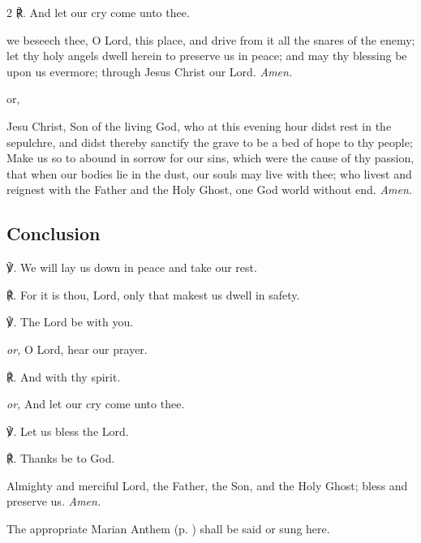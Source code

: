 \begin{multicols}{2}
℟. And let our cry come unto thee.

{} we beseech thee, O Lord, this place, and drive from it all the snares of the enemy; let thy holy angels dwell herein to preserve us in peace; and may thy blessing be upon us evermore; through Jesus Christ our Lord. \textit{Amen.}

\begin{inhead}
	or,
\end{inhead}

 Jesu Christ, Son of the living God, who at this evening hour didst rest in the sepulchre, and didst thereby sanctify the grave to be a bed of hope to thy people; Make us so to abound in sorrow for our sins, which were the cause of thy passion, that when our bodies lie in the dust, our souls may live with thee; who livest and reignest with the Father and the Holy Ghost, one God world without end. \textit{Amen.}



\newcolumn

\subsection{Conclusion}
℣. We will lay us down in peace and take our rest.\par
℟. For it is thou, Lord, only that makest us dwell in safety.\par
℣. The Lord be with you.\par
\textit{or,} O Lord, hear our prayer.\par
℟. And with thy spirit.\par
\textit{or,} And let our cry come unto thee.\par
℣. Let us bless the Lord.\par
℟. Thanks be to God.

 Almighty and merciful Lord, the Father, {} the Son, and the Holy Ghost; bless and preserve us. \textit{Amen.}

\begin{rubric}
	{The appropriate Marian Anthem (p. \pageref{Mary}) shall be said or sung here.}
 \end{rubric}
 
 \end{multicols}
